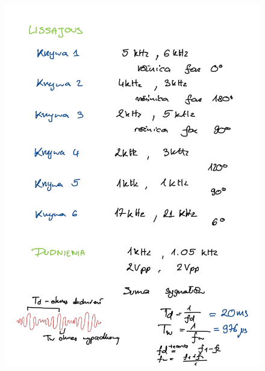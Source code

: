 \documentclass[14pt, table]{extarticle}
\begin{document}
\begin{figure}[H]
\includegraphics[scale=0.23]{B2}
\centering
\end{figure}
\end{document}
